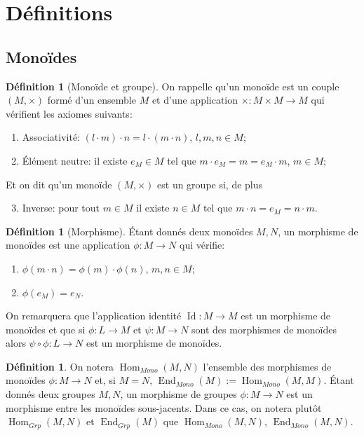 \documentclass[a4paper, oneside, 12pt]{book}
\theoremstyle{theoremeStyle} %
\theoremstyle{definition} %
\newtheorem{definition}[theoreme]{Définition}
\DeclareMathOperator{\SEnd}{End}
\DeclareMathOperator{\SHom}{Hom}
\DeclareMathOperator{\Id}{Id}
\begin{document}
\section{Définitions}

\subsection{Monoïdes}

\begin{definition}[Monoïde et groupe]
	On rappelle qu'un monoïde  est un couple $(M,\times)$ formé d'un ensemble $M$ et d'une application $\times:M\times M\rightarrow M$ qui vérifient les axiomes suivants:
	\begin{enumerate}
	\item Associativité: $(l\cdot m)\cdot n=l\cdot (m\cdot n)$, $l,m,n\in M$;
	\item Élément neutre: il existe $e_M\in M$ tel que $m\cdot e_M=m=e_M\cdot m$, $m\in M$;
	\end{enumerate}
	Et on dit qu'un monoïde    $(M,\times)$ est un groupe si, de plus
\begin{enumerate}
\setcounter{enumi}{2}
\item Inverse: pour tout $m\in M$ il existe $n\in M$ tel  que $m\cdot n=e_M=n\cdot m$.\\
\end{enumerate}
\end{definition}
\begin{definition}[Morphisme]Étant donnés deux monoïdes $M,N$, un morphisme de monoïdes est une application $\phi:M\rightarrow N$   qui vérifie:
\begin{enumerate}
\item $\phi(m\cdot n)=\phi(m)\cdot\phi(n)$, $m,n\in M$;
\item $\phi(e_M )=e_N$.
\end{enumerate}
\end{definition}
On remarquera que l'application identité $\Id:M\rightarrow M$ est un morphisme de monoïdes et que si $\phi:L\rightarrow M$ et $\psi:M\rightarrow N$ sont des morphismes de monoïdes alors $\psi\circ \phi:L\rightarrow N$ est un morphisme de monoïdes.

\begin{definition}On notera $\SHom_{Mono}(M,N)$ l'ensemble des morphismes de monoïdes $\phi:M\rightarrow N$ et, si $M=N$, $\SEnd_{Mono}(M):=\SHom_{Mono}(M,M)$.  Étant donnés deux groupes $M,N$, un morphisme de groupes $\phi:M\rightarrow N$ est un morphisme entre les monoïdes sous-jacents. Dans ce cas, on notera plutôt $\SHom_{Grp}(M,N)$ et $\SEnd_{Grp}(M)$ que $\SHom_{Mono}(M,N)$, $\SEnd_{Mono}(M,N)$. 
\end{definition}
\end{document}
